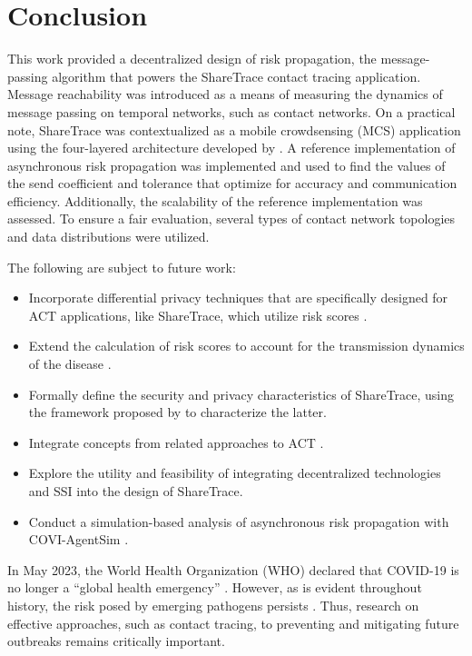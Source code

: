 \chapter{Conclusion}\label{ch:conclusion}

This work provided a decentralized design of risk propagation, the message-passing algorithm that powers the ShareTrace contact tracing application. Message reachability was introduced as a means of measuring the dynamics of message passing on temporal networks, such as contact networks. On a practical note, ShareTrace was contextualized as a mobile crowdsensing (MCS) application using the four-layered architecture developed by \citet{Capponi2019}. A reference implementation of asynchronous risk propagation was implemented and used to find the values of the send coefficient and tolerance that optimize for accuracy and communication efficiency. Additionally, the scalability of the reference implementation was assessed. To ensure a fair evaluation, several types of contact network topologies and data distributions were utilized.

The following are subject to future work:
\begin{itemize}
  \item Incorporate differential privacy techniques that are specifically designed for ACT applications, like ShareTrace, which utilize risk scores \citep{Romijnders2024}.
  \item Extend the calculation of risk scores to account for the transmission dynamics of the disease \citep{Ferretti2020, Ferretti2024}.
  \item Formally define the security and privacy characteristics of ShareTrace, using the framework proposed by \citet{Kuhn2021} to characterize the latter.
  \item Integrate concepts from related approaches to ACT \citep{Reichert2020, Cho2020, Cherini2023, Gupta2023}.
  \item Explore the utility and feasibility of integrating decentralized technologies \citep{Benet2014, Troncoso2017, Trautwein2022, Shi2024, Keizer2024} and SSI \citep{Preukschat2021, Schardong2022} into the design of ShareTrace.
  \item Conduct a simulation-based analysis of asynchronous risk propagation with COVI-AgentSim \citep{Gupta2020}.
\end{itemize}

In May 2023, the World Health Organization (WHO) declared that COVID-19 is no longer a ``global health emergency'' \citep{Wise2023}. However, as is evident throughout history, the risk posed by emerging pathogens persists \citep{Piret2021, Tabish2022}. Thus, research on effective approaches, such as contact tracing, to preventing and mitigating future outbreaks remains critically important.